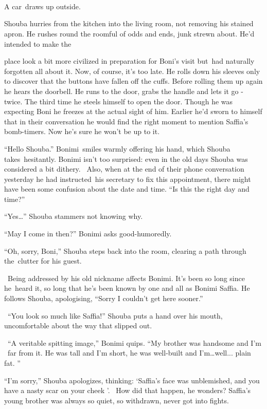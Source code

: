 \documentclass[twoside,11pt]{book}
\begin{document}
~

\chapter{}

A car~draws up outside.{ }

Shouba hurries from the kitchen into the living room, not removing his stained apron. He rushes round the roomful of
odds and ends, junk strewn about. He'd intended to make the

place look a bit more civilized in preparation for Boni's visit but~had naturally forgotten all about it. Now, of
course, it's too late. He rolls down his sleeves only to discover that the buttons have fallen off the cuffs. Before
rolling them up again he hears the doorbell. He runs to the door, grabs the handle and lets it go - twice. The third
time he steels himself to open the door. Though he was expecting Boni he freezes at the actual sight of him. Earlier
he'd sworn to himself that in their conversation he would find the right moment to mention Saffia's bomb-timers. Now
he's sure he won't be up to it.

``Hello Shouba.'' Bonimi~smiles warmly offering his hand, which Shouba takes~hesitantly.
Bonimi isn't too surprised: even in the old days Shouba was considered a bit dithery. \ Also, when at the end of their
phone conversation yesterday he had instructed~his secretary to fix this appointment, there might have been some
confusion about the date and time. ``Is this the right day and time?''

``Yes{\dots}'' Shouba stammers not knowing why.

``May I come in then?'' Bonimi asks good-humoredly.

``Oh, sorry, Boni,'' Shouba steps back into the room, clearing a path through the~clutter for
his guest.

~Being addressed by his old nickname affects Bonimi. It's been so long since he~heard it, so long that he's been known
by{ }one and all as Bonimi Saffia. He follows Shouba, apologising, ``Sorry I
couldn't get here sooner.''

~``You look so much like Saffia!'' Shouba puts a hand over his mouth, uncomfortable about the
way that slipped out.

~``A veritable spitting image,'' Bonimi quips. ``My brother was handsome and I'm
~far from it. He was tall and I'm short, he was well-built and I'm{\dots}well... plain fat. ''

``I'm sorry,'' Shouba apologizes, thinking: `Saffia's face was unblemished,
and{ }you have a nasty scar on your cheek '. \ How did that happen, he wonders?
Saffia's young brother was always so quiet, so withdrawn, never got into fights.
\end{document}
